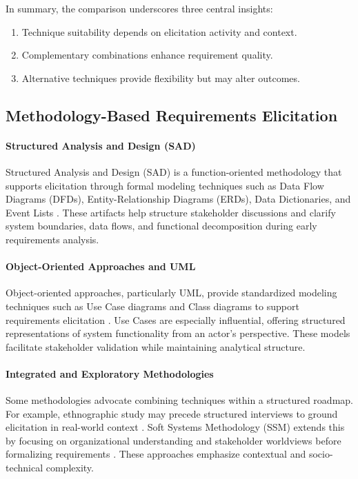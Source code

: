 In summary, the comparison underscores three central insights:
\begin{enumerate}
    \item Technique suitability depends on elicitation activity and context.
    \item Complementary combinations enhance requirement quality.
    \item Alternative techniques provide flexibility but may alter outcomes.
\end{enumerate}

\subsection{Methodology-Based Requirements Elicitation}

\paragraph{Structured Analysis and Design (SAD)}
Structured Analysis and Design (SAD) is a function-oriented methodology that supports elicitation through formal modeling techniques such as Data Flow Diagrams (DFDs), Entity-Relationship Diagrams (ERDs), Data Dictionaries, and Event Lists \cite{DeMarco1979,Yourdon1989}. These artifacts help structure stakeholder discussions and clarify system boundaries, data flows, and functional decomposition during early requirements analysis.

\paragraph{Object-Oriented Approaches and UML}

Object-oriented approaches, particularly UML, provide standardized modeling techniques such as Use Case diagrams and Class diagrams to support requirements elicitation \cite{Cockburn2001}. Use Cases are especially influential, offering structured representations of system functionality from an actor's perspective. These models facilitate stakeholder validation while maintaining analytical structure.

\paragraph{Integrated and Exploratory Methodologies}

Some methodologies advocate combining techniques within a structured roadmap. For example, ethnographic study may precede structured interviews to ground elicitation in real-world context \cite{Goguen1993}. Soft Systems Methodology (SSM) extends this by focusing on organizational understanding and stakeholder worldviews before formalizing requirements \cite{Checkland1990}. These approaches emphasize contextual and socio-technical complexity.

